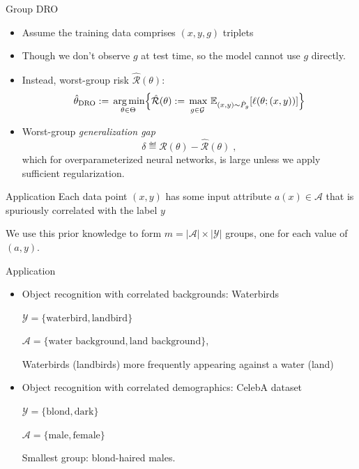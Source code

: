 \documentclass{beamer}
\begin{document}
\begin{viterbiframe}{Group DRO}
\begin{itemize}
    \item Assume the training data comprises $(x, y, g)$ triplets
    \pause
    \item Though we \alert{don't observe} $g$ at test time, so the model cannot use $g$ directly. 
    \pause
    \item Instead, worst-group risk $\hat{\mathcal{R}}(\theta)$:
    \begin{align}
      \htdro := \underset{\theta \in \Theta}{\vphantom{\sup}\argmin} \Bigl\{\hat{\mathcal{R}}(\theta) :=  \underset{g \in \mathcal{G}}{\vphantom{\argmin}\max} \ \E_{(x, y) \sim \hP_g}[\ell(\theta; (x, y))] \Bigr\}\nonumber
    \end{align}
    
    \item Worst-group \emph{generalization gap}
    \[\delta \eqdef  \mathcal{R}(\theta)  -\hat{\mathcal{R}}(\theta)\;,\]
    which for overparameterized neural networks, is large unless we apply \alert{sufficient regularization}.
\end{itemize}
\end{viterbiframe}


\begin{viterbiframe}{Application}
    Each data point $(x, y)$ has some \alert{input attribute} $a(x) \in \mathcal{A}$ that is spuriously correlated with the label $y$
    \pause
    
    We use this prior knowledge to \alert{form $m = |\mathcal{A}| \times |\mathcal{Y}|$} groups, one for each value of $(a, y)$.
    
    \pause
    
    
\end{viterbiframe}

\begin{viterbiframe}{Application}

\begin{itemize}

    \item Object recognition with correlated \alert{backgrounds}: Waterbirds
    
    $\mathcal{Y} = \{\text{waterbird}, \text{landbird}\}$
    
    $\mathcal{A} = \{\text{water background}, \text{land background}\}$,
    
    Waterbirds (landbirds) more frequently appearing against a water (land)
    
    \pause
    \item Object recognition with correlated \alert{demographics}: CelebA dataset
    
    $\mathcal{Y} = \{\text{blond}, \text{dark}\}$
    
    $\mathcal{A} = \{\text{male}, \text{female}\}$
    
    Smallest group: blond-haired males.
\end{itemize}
\end{viterbiframe}
\end{document}
